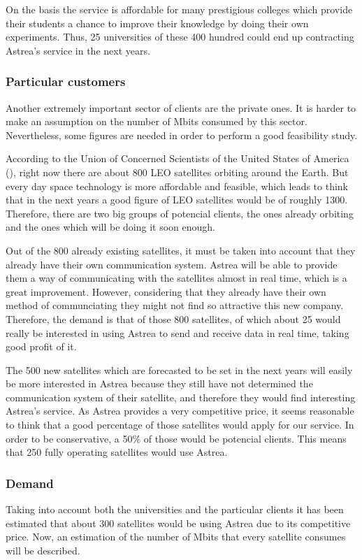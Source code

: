 On the basis the service is affordable for many prestigious colleges which provide their students a chance to improve their knowledge by doing their own experiments. Thus, 25 universities of these 400 hundred could end up contracting Astrea's service in the next years.

\subsubsection{Particular customers}
Another extremely important sector of clients are the private ones. It is harder to make an assumption on the number of Mbits consumed by this sector. Nevertheless, some figures are needed in order to perform a good feasibility study. 

According to the Union of Concerned Scientists of the United States of America (\cite{UCSUSA}), right now there are about 800 LEO satellites orbiting around the Earth. But every day space technology is more affordable and feasible, which leads to think that in the next years a good figure of LEO satellites would be of roughly 1300. Therefore, there are two big groups of potencial clients, the ones already orbiting and the ones which will be doing it soon enough.

Out of the 800 already existing satellites, it must be taken into account that they already have their own communication system. Astrea will be able to provide them a way of communicating with the satellites almost in real time, which is a great improvement. However, considering that they already have their own method of communciating they might not find so attractive this new company. Therefore, the demand is that of those 800 satellites, of which about 25 would really be interested in using Astrea to send and receive data in real time, taking good profit of it.

The 500 new satellites which are forecasted to be set in the next years will easily be more interested in Astrea because they still have not determined the communication system of their satellite, and therefore they would find interesting Astrea's service. As Astrea provides a very competitive price, it seems reasonable to think that a good percentage of those satellites would apply for our service. In order to be conservative, a 50\% of those would be potencial clients. This means that 250 fully operating satellites would use Astrea.

\subsubsection{Demand}
Taking into account both the universities and the particular clients it has been estimated that about 300 satellites would be using Astrea due to its competitive price. Now, an estimation of the number of Mbits that every satellite consumes will be described.

